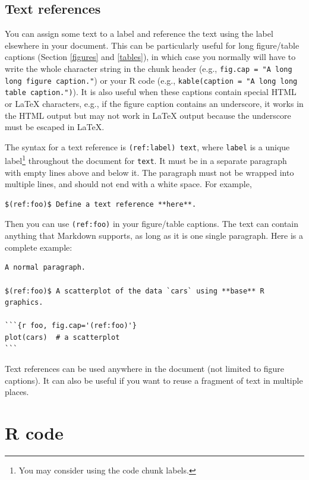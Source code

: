 \documentclass[doctor,openright,twoside]{sjtuthesis}
\newcommand{\passthrough}[1]{#1}
\theoremstyle{plain}
\theoremstyle{definition}
\theoremstyle{remark}
\theoremstyle{ocrenumbox}
\theoremstyle{plain}
\begin{document}
\hypertarget{text-references}{%
\subsection{Text references}\label{text-references}}

You can assign some text to a label and reference the text using the
label elsewhere in your document. This can be particularly useful for
long figure/table captions (Section \ref{figures} and \ref{tables}), in
which case you normally will have to write the whole character string in
the chunk header (e.g.,
\passthrough{\lstinline!fig.cap = "A long long figure caption."!}) or
your R code (e.g.,
\passthrough{\lstinline!kable(caption = "A long long table caption.")!}).
It is also useful when these captions contain special HTML or LaTeX
characters, e.g., if the figure caption contains an underscore, it works
in the HTML output but may not work in LaTeX output because the
underscore must be escaped in LaTeX.

The syntax for a text reference is
\passthrough{\lstinline!(ref:label) text!}, where
\passthrough{\lstinline!label!} is a unique label\footnote{You may
  consider using the code chunk labels.} throughout the document for
\passthrough{\lstinline!text!}. It must be in a separate paragraph with
empty lines above and below it. The paragraph must not be wrapped into
multiple lines, and should not end with a white space. For example,

\begin{lstlisting}
$(ref:foo)$ Define a text reference **here**. 
\end{lstlisting}

Then you can use \passthrough{\lstinline!(ref:foo)!} in your
figure/table captions. The text can contain anything that Markdown
supports, as long as it is one single paragraph. Here is a complete
example:

\begin{lstlisting}
A normal paragraph.

$(ref:foo)$ A scatterplot of the data `cars` using **base** R graphics. 

```{r foo, fig.cap='(ref:foo)'}
plot(cars)  # a scatterplot
```
\end{lstlisting}

Text references can be used anywhere in the document (not limited to
figure captions). It can also be useful if you want to reuse a fragment
of text in multiple places.

\hypertarget{r-code}{%
\section{R code}\label{r-code}}
\end{document}
